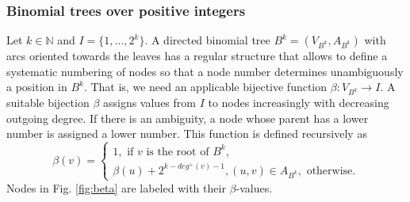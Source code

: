 \subsubsection{Binomial trees over positive integers}

Let $k\in \mathbb{N}$ and $I=\{1,\dots,2^k\}$.
A directed binomial tree $B^k=(V_{B^k},A_{B^k})$ with arcs oriented towards the leaves has a regular structure that allows to define a systematic numbering of nodes so that a node number determines unambiguously a position in $B^k$.
That is, we need an applicable bijective function $\beta:V_{B^k}\to I$.
A suitable bijection $\beta$ assigns values from $I$ to nodes increasingly with decreasing outgoing degree.
If there is an ambiguity, a node whose parent has a lower number is assigned a lower number.
This function is defined recursively as
\begin{equation*}
\label{eq:beta}
\beta(v)=\begin{cases}
1,\text{ if } v \text{ is the root of } B^k,\\
\beta(u) + 2^{k-deg^+(v)-1}, (u,v)\in A_{B^k},\text{ otherwise}.
\end{cases}
\end{equation*}
Nodes in Fig. \ref{fig:beta} are labeled with their $\beta$-values.

